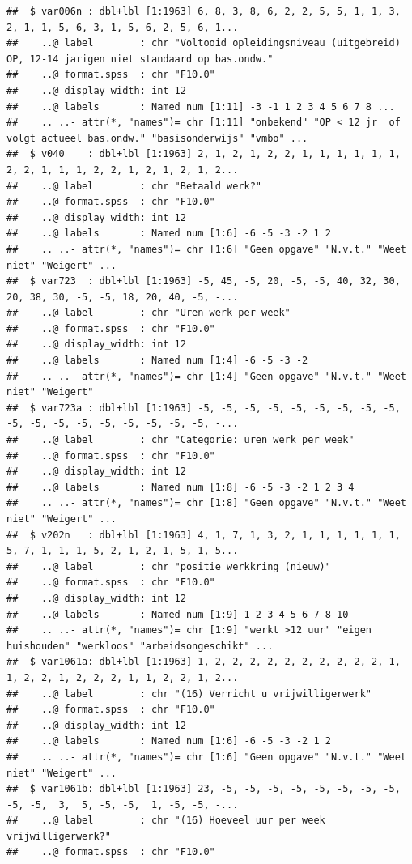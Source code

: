 \documentclass[
]{book}
\begin{document}
\begin{verbatim}
##  $ var006n : dbl+lbl [1:1963] 6, 8, 3, 8, 6, 2, 2, 5, 5, 1, 1, 3, 2, 1, 1, 5, 6, 3, 1, 5, 6, 2, 5, 6, 1...
##    ..@ label        : chr "Voltooid opleidingsniveau (uitgebreid) OP, 12-14 jarigen niet standaard op bas.ondw."
##    ..@ format.spss  : chr "F10.0"
##    ..@ display_width: int 12
##    ..@ labels       : Named num [1:11] -3 -1 1 2 3 4 5 6 7 8 ...
##    .. ..- attr(*, "names")= chr [1:11] "onbekend" "OP < 12 jr  of volgt actueel bas.ondw." "basisonderwijs" "vmbo" ...
##  $ v040    : dbl+lbl [1:1963] 2, 1, 2, 1, 2, 2, 1, 1, 1, 1, 1, 1, 2, 2, 1, 1, 1, 2, 2, 1, 2, 1, 2, 1, 2...
##    ..@ label        : chr "Betaald werk?"
##    ..@ format.spss  : chr "F10.0"
##    ..@ display_width: int 12
##    ..@ labels       : Named num [1:6] -6 -5 -3 -2 1 2
##    .. ..- attr(*, "names")= chr [1:6] "Geen opgave" "N.v.t." "Weet niet" "Weigert" ...
##  $ var723  : dbl+lbl [1:1963] -5, 45, -5, 20, -5, -5, 40, 32, 30, 20, 38, 30, -5, -5, 18, 20, 40, -5, -...
##    ..@ label        : chr "Uren werk per week"
##    ..@ format.spss  : chr "F10.0"
##    ..@ display_width: int 12
##    ..@ labels       : Named num [1:4] -6 -5 -3 -2
##    .. ..- attr(*, "names")= chr [1:4] "Geen opgave" "N.v.t." "Weet niet" "Weigert"
##  $ var723a : dbl+lbl [1:1963] -5, -5, -5, -5, -5, -5, -5, -5, -5, -5, -5, -5, -5, -5, -5, -5, -5, -5, -...
##    ..@ label        : chr "Categorie: uren werk per week"
##    ..@ format.spss  : chr "F10.0"
##    ..@ display_width: int 12
##    ..@ labels       : Named num [1:8] -6 -5 -3 -2 1 2 3 4
##    .. ..- attr(*, "names")= chr [1:8] "Geen opgave" "N.v.t." "Weet niet" "Weigert" ...
##  $ v202n   : dbl+lbl [1:1963] 4, 1, 7, 1, 3, 2, 1, 1, 1, 1, 1, 1, 5, 7, 1, 1, 1, 5, 2, 1, 2, 1, 5, 1, 5...
##    ..@ label        : chr "positie werkkring (nieuw)"
##    ..@ format.spss  : chr "F10.0"
##    ..@ display_width: int 12
##    ..@ labels       : Named num [1:9] 1 2 3 4 5 6 7 8 10
##    .. ..- attr(*, "names")= chr [1:9] "werkt >12 uur" "eigen huishouden" "werkloos" "arbeidsongeschikt" ...
##  $ var1061a: dbl+lbl [1:1963] 1, 2, 2, 2, 2, 2, 2, 2, 2, 2, 2, 1, 1, 2, 2, 1, 2, 2, 2, 1, 1, 2, 2, 1, 2...
##    ..@ label        : chr "(16) Verricht u vrijwilligerwerk"
##    ..@ format.spss  : chr "F10.0"
##    ..@ display_width: int 12
##    ..@ labels       : Named num [1:6] -6 -5 -3 -2 1 2
##    .. ..- attr(*, "names")= chr [1:6] "Geen opgave" "N.v.t." "Weet niet" "Weigert" ...
##  $ var1061b: dbl+lbl [1:1963] 23, -5, -5, -5, -5, -5, -5, -5, -5, -5, -5,  3,  5, -5, -5,  1, -5, -5, -...
##    ..@ label        : chr "(16) Hoeveel uur per week vrijwilligerwerk?"
##    ..@ format.spss  : chr "F10.0"

\end{verbatim}
\end{document}
